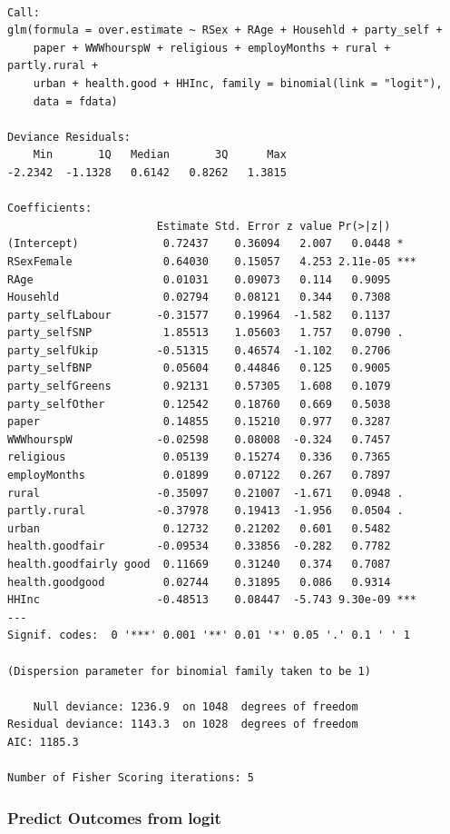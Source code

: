 \documentclass[]{article}
\begin{document}
\begin{verbatim}

Call:
glm(formula = over.estimate ~ RSex + RAge + Househld + party_self + 
    paper + WWWhourspW + religious + employMonths + rural + partly.rural + 
    urban + health.good + HHInc, family = binomial(link = "logit"), 
    data = fdata)

Deviance Residuals: 
    Min       1Q   Median       3Q      Max  
-2.2342  -1.1328   0.6142   0.8262   1.3815  

Coefficients:
                       Estimate Std. Error z value Pr(>|z|)    
(Intercept)             0.72437    0.36094   2.007   0.0448 *  
RSexFemale              0.64030    0.15057   4.253 2.11e-05 ***
RAge                    0.01031    0.09073   0.114   0.9095    
Househld                0.02794    0.08121   0.344   0.7308    
party_selfLabour       -0.31577    0.19964  -1.582   0.1137    
party_selfSNP           1.85513    1.05603   1.757   0.0790 .  
party_selfUkip         -0.51315    0.46574  -1.102   0.2706    
party_selfBNP           0.05604    0.44846   0.125   0.9005    
party_selfGreens        0.92131    0.57305   1.608   0.1079    
party_selfOther         0.12542    0.18760   0.669   0.5038    
paper                   0.14855    0.15210   0.977   0.3287    
WWWhourspW             -0.02598    0.08008  -0.324   0.7457    
religious               0.05139    0.15274   0.336   0.7365    
employMonths            0.01899    0.07122   0.267   0.7897    
rural                  -0.35097    0.21007  -1.671   0.0948 .  
partly.rural           -0.37978    0.19413  -1.956   0.0504 .  
urban                   0.12732    0.21202   0.601   0.5482    
health.goodfair        -0.09534    0.33856  -0.282   0.7782    
health.goodfairly good  0.11669    0.31240   0.374   0.7087    
health.goodgood         0.02744    0.31895   0.086   0.9314    
HHInc                  -0.48513    0.08447  -5.743 9.30e-09 ***
---
Signif. codes:  0 '***' 0.001 '**' 0.01 '*' 0.05 '.' 0.1 ' ' 1

(Dispersion parameter for binomial family taken to be 1)

    Null deviance: 1236.9  on 1048  degrees of freedom
Residual deviance: 1143.3  on 1028  degrees of freedom
AIC: 1185.3

Number of Fisher Scoring iterations: 5
\end{verbatim}

\hypertarget{predict-outcomes-from-logit}{%
\subsubsection{Predict Outcomes from logit}\label{predict-outcomes-from-logit}}
\end{document}
